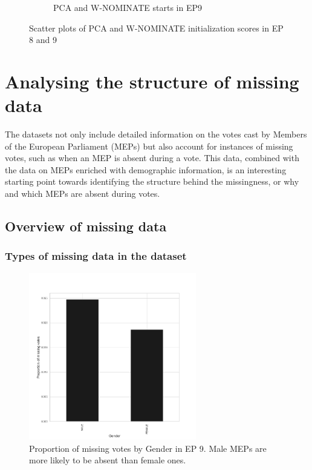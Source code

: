 \documentclass[a4paper,12pt]{report}
\begin{document}
\begin{figure}[H]
\begin{subfigure}[b]{0.48\textwidth}
            \caption{PCA and W-NOMINATE starts in EP9}
            \label{fig:pca_SCATTER_9}
        \end{subfigure}
        \caption
        {Scatter plots of PCA and W-NOMINATE initialization scores in EP 8 and 9}
        \label{fig:pca_scatter89}
    \end{figure}


    \chapter{Analysing the structure of missing data}\label{ch:analysing-the-structure-of-missing-data}
    The datasets not only include detailed information on the votes cast by Members of the European Parliament (MEPs)
    but also account for instances of missing votes, such as when an MEP is absent during a vote. This data,
    combined with the data on MEPs enriched with demographic information, is an interesting starting point towards
    identifying the structure behind the missingness, or why and which MEPs are absent during votes.


    \section{Overview of missing data}\label{sec:overview-of-missing-data}

    \subsection{Types of missing data in the dataset}\label{subsec:types-of-missing-data-in-the-dataset}

    \begin{figure}[htb]
        \centering
        \includegraphics[width=0.65\textwidth]{Graphs/genderreport}
        \caption
        {Proportion of missing votes by Gender in EP 9. Male MEPs are more likely to be absent than female ones.}
        \label{fig:gender}
    \end{figure}
\end{document}
